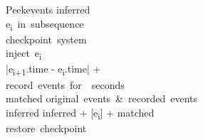 \documentclass{standalone}
\begin{document}
\begin{pseudocode}{Peek}{events}
  inferred \GETS [\ ] \\
  \FOR e\textsubscript{i}\ in\ subsequence \\
  \BEGIN
    checkpoint\ system \\
    inject\ e\textsubscript{i} \\
    \Delta \GETS |e\textsubscript{i+1}.time - e\textsubscript{i}.time| + \epsilon \\
    record\ events\ for\ \Delta\ seconds \\
    matched \GETS original\ events\ \&\ recorded\ events \\
    inferred \GETS inferred + [e\textsubscript{i}] + matched \\
    restore\ checkpoint\\
  \END \\
  \ENDPROCEDURE
\end{pseudocode}
\end{document}
